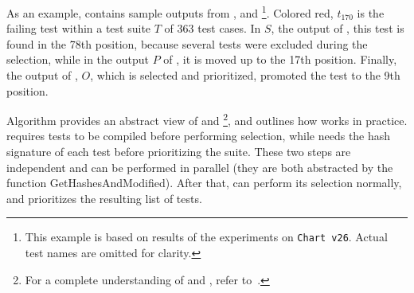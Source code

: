As an example,  contains sample outputs from \ek, \fs and \fz\footnote{This example is based on results of the experiments on \texttt{Chart v26}. Actual test names are omitted for clarity.}.
Colored red, $t_{170}$ is the failing test within a test suite $T$ of 363 test cases.
In $S$, the output of \ek, this test is found in the 78th position, because several tests were excluded during the selection, while in the output $P$ of \fs, it is moved up to the 17th position.
Finally, the output of \fz, $O$, which is selected and prioritized, promoted the test to the 9th position.

Algorithm  provides an abstract view of \ek and \fs\footnote{For a complete understanding of \ek and \fs, refer to~\cite{gligoricEk,miranda_fast}.}, and outlines how \fz works in practice.
\ek requires tests to be compiled before performing selection, while \fs needs the hash signature of each test before prioritizing the suite.
These two steps are independent and can be performed in parallel (they are both abstracted by the function GetHashesAndModified).
After that, \ek can perform its selection normally, and \fs prioritizes the resulting list of tests.





